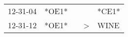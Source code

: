 \begin{supertabular}{lllll}
 12-31-04 &  *OE1* &   &               &  *CE1* \\
 12-31-12 &  *OE1* &   &  \textgreater &   WINE \\
\end{supertabular}
